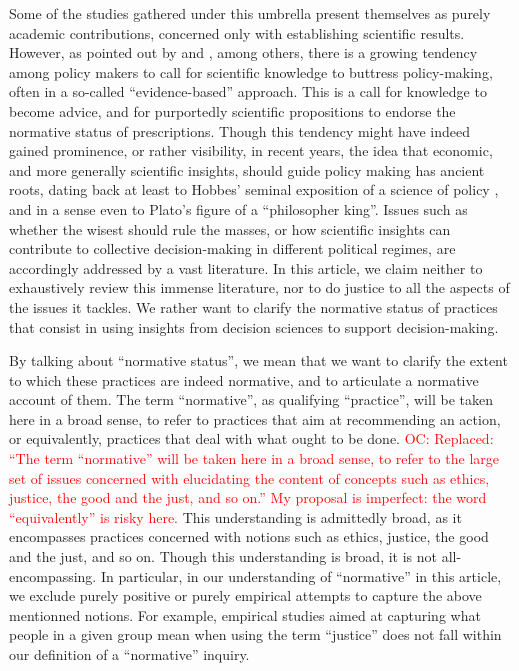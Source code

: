 \documentclass[preprint, french, english, 11pt, authoryear]{elsarticle}%
\newcommand{\commentOC}[1]{\textcolor{red}{OC: #1}}
\begin{document}
Some of the studies gathered under this umbrella present themselves as purely academic contributions, concerned only with establishing scientific results. However, as pointed out by \citet{tsoukias_policy_2013} and \cite{marchi_evidence-based_2016}, among others, there is a growing tendency among policy makers to call for scientific knowledge to buttress policy-making, often in a so-called ``evidence-based'' approach. This is a call for knowledge to become advice, and for purportedly scientific propositions to endorse the normative status of prescriptions. Though this tendency might have indeed gained prominence, or rather visibility, in recent years, the idea that economic, and more generally scientific insights, should guide policy making has ancient roots, dating back at least to Hobbes’ seminal exposition of a science of policy \citep{skinner_reason_1996}, and in a sense even to Plato's figure of a ``philosopher king''. Issues such as whether the wisest should rule the masses, or how scientific insights can contribute to collective decision-making in different political regimes, are accordingly addressed by a vast literature. In this article, we claim neither to exhaustively review this immense literature, nor to do justice to all the aspects of the issues it tackles. We rather want to clarify the normative status of practices that consist in using insights from decision sciences to support decision-making.

By talking about ``normative status'', we mean that we want to clarify the extent to which these practices are indeed normative, and to articulate a normative account of them. 
The term ``normative'', as qualifying “practice”, will be taken here in a broad sense, to refer to practices that aim at recommending an action, or equivalently, practices that deal with what ought to be done.
\commentOC{Replaced: “The term ``normative'' will be taken here in a broad sense, to refer to the large set of issues concerned with elucidating the content of concepts such as ethics, justice, the good and the just, and so on.” My proposal is imperfect: the word “equivalently” is risky here.}
This understanding is admittedly broad, as it encompasses practices concerned with notions such as ethics, justice, the good and the just, and so on. 
Though this understanding is broad, it is not all-encompassing. In particular, in our understanding of ``normative'' in this article, we exclude purely positive or purely empirical attempts to capture the above mentionned notions. For example, empirical studies aimed at capturing what people in a given group mean when using the term ``justice'' does not fall within our definition of a ``normative'' inquiry.
\end{document}
